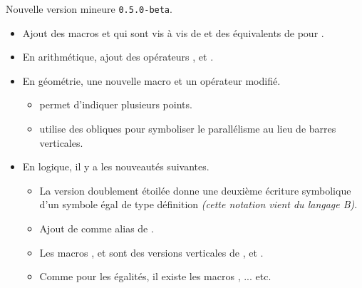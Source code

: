 Nouvelle version mineure \verb+0.5.0-beta+.

\begin{itemize}[itemsep=.5em]
    \item Ajout des macros  et  qui sont vis à vis de  et  des équivalents de  pour .




    \item En arithmétique, ajout des opérateurs ,  et .




    \item En géométrie, une nouvelle macro et un opérateur modifié.
    \begin{itemize}[itemsep=.5em]
        \item {} permet d'indiquer plusieurs points.

        \item {} utilise des obliques pour symboliser le parallélisme au lieu de barres verticales.
    \end{itemize}




    \item En logique, il y a les nouveautés suivantes.
    \begin{itemize}[itemsep=.5em]
        \item La version doublement étoilée  donne une deuxième écriture symbolique d'un symbole égal de type définition \emph{(cette notation vient du langage B)}.

        \item Ajout de  comme alias de .

        \item Les macros ,  et  sont des versions verticales de ,  et .

        \item Comme pour les égalités, il existe les macros ,  ... etc.
    \end{itemize}
\end{itemize}
